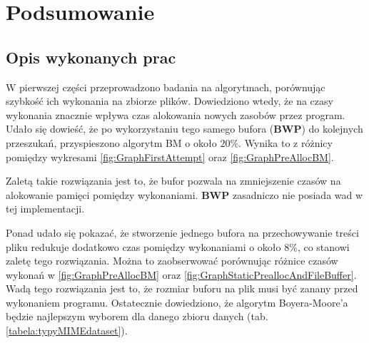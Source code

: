 
\chapter{Podsumowanie}



\section{Opis wykonanych prac}

W pierwszej części przeprowadzono badania na algorytmach, porównując szybkość
ich wykonania na zbiorze plików. Dowiedziono wtedy, że na czasy wykonania 
znacznie wpływa czas alokowania nowych zasobów przez program. Udało się dowieść,
że po wykorzystaniu tego samego bufora (\textbf{BWP}) do kolejnych przeszukań, przyspieszono 
algorytm BM o około $20 \%$. Wynika to z różnicy pomiędzy
wykresami \ref{fig:GraphFirstAttempt} oraz \ref{fig:GraphPreAllocBM}.

Zaletą takie rozwiązania jest to, że bufor pozwala na zmniejszenie czasów
na alokowanie pamięci pomiędzy wykonaniami. \textbf{BWP} zasadniczo nie posiada wad w
tej implementacji. 

Ponad udało się pokazać, że stworzenie jednego bufora na przechowywanie treści
pliku redukuje dodatkowo czas pomiędzy wykonaniami o około $8 \%$, co stanowi
zaletę tego rozwiązania. Można to zaobserwować porównując różnice czasów wykonań
w \ref{fig:GraphPreAllocBM} oraz \ref{fig:GraphStaticPreallocAndFileBuffer}. Wadą
tego rozwiązania jest to, że rozmiar buforu na plik musi być zanany przed
wykonaniem programu. Ostatecznie dowiedziono, że algorytm Boyera-Moore'a będzie
najlepszym wyborem dla danego zbioru danych (tab. \ref{tabela:typyMIMEdataset}).

